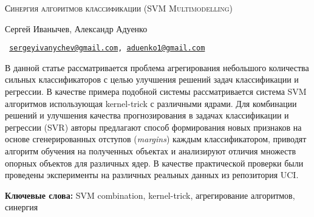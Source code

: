 \documentclass[a4paper, 10pt]{article}
\begin{document}
\begin{center}
    \vspace{2.6cm}
    \textsc{\LARGE Синергия алгоритмов классификации (SVM Multimodelling)}
    \vspace{0.6cm}

    { Сергей Иванычев, Александр Адуенко}

\texttt{\small
    \href{mailto:sergeyivanychev@gmail.com}{sergeyivanychev@gmail.com},  \href{mailto:aduenko1@gmail.com}{aduenko1@gmail.com}
}
    \vspace{0.6cm}
    \end{center}
    \noindent\makebox[\linewidth]{\rule{\textwidth}{0.4pt}}

    {\textbf{}\small В данной статье рассматривается проблема агрегирования небольшого количества сильных классификаторов с целью улучшения решений задач классификации и регрессии.  В качестве примера подобной системы рассматривается система SVM  алгоритмов использующая kernel-trick с различными ядрами. Для комбинации решений и улучшения качества прогнозирования в задачах классификации и регрессии (SVR) авторы предлагают способ формирования новых признаков на основе сгенерированных отступов (\emph{margins}) каждым классификатором, приводят алгоритм обучения на полученных объектах и анализируют отличия множеств опорных объектов для различных ядер. В качестве практической проверки были проведены эксперименты на различных реальных данных из репозитория UCI.

    \textbf{Ключевые слова:} SVM combination, kernel-trick, агрегирование алгоритмов, синергия}
    
        \noindent\makebox[\linewidth]{\rule{\textwidth}{0.4pt}}

    \vspace{1cm}
    
\end{document}
